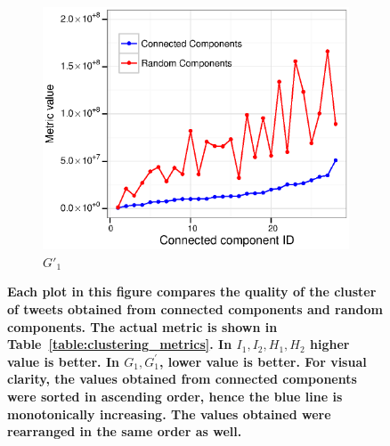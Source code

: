 \begin{figure}
\begin{subfigure}[b]{0.3\textwidth}
    \includegraphics[width=\textwidth]{figures_supp/Plots_from_data/cc_validation/G1P.eps}
    \caption{$G'_1$} \label{fig:G1P}
  \end{subfigure}

  \caption{\textbf{Each plot in this figure compares the
          quality of the cluster of tweets obtained from connected
          components and random components. The actual metric is shown
          in Table~\ref{table:clustering_metrics}. In $I_1, I_2, H_1,
          H_2$ higher value is better. In $G_1, G_1^{'}$, lower value
          is better. For visual clarity, the values obtained from
          connected components were sorted in ascending order, hence
          the blue line is monotonically increasing. The values
          obtained were rearranged in the same order as well.}}
    \label{fig:connected_components_validation}
\end{figure}


